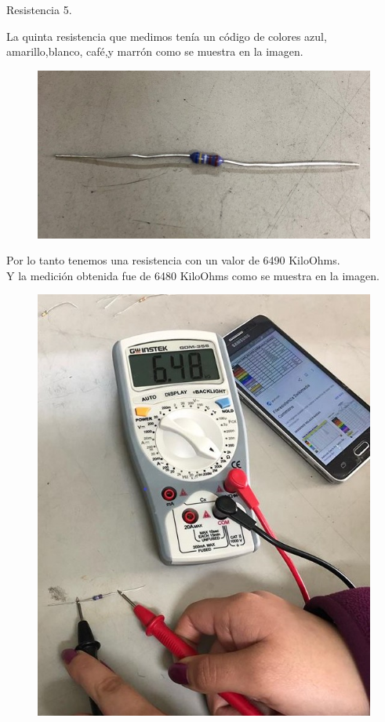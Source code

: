 \documentclass[12pt,a4paper]{report}
\begin{document}
\begin{flushleft}
		\begin{large}
		\vspace*{2cm}
		Resistencia 5.\\
	\end{large}
	La quinta resistencia que medimos ten\'ia un c\'odigo de colores azul, amarillo,blanco, caf\'e,y marr\'on como se muestra en la imagen.
	
	\begin{figure}[H]
		\centering
		\includegraphics[width=0.4\linewidth]{resistencia5}
		\label{fig:resistencia5}
	\end{figure}
	Por lo tanto tenemos una resistencia con un valor de 6490 KiloOhms.\\
	Y la medici\'on obtenida fue de 6480 KiloOhms como se muestra en la imagen.\\
	\begin{figure}[H]
		\centering
		\includegraphics[width=0.3\linewidth]{medicion5}
		\label{fig:medicion5}
	\end{figure}
	
	

	 




	
\end{flushleft}
	
\end{document}
